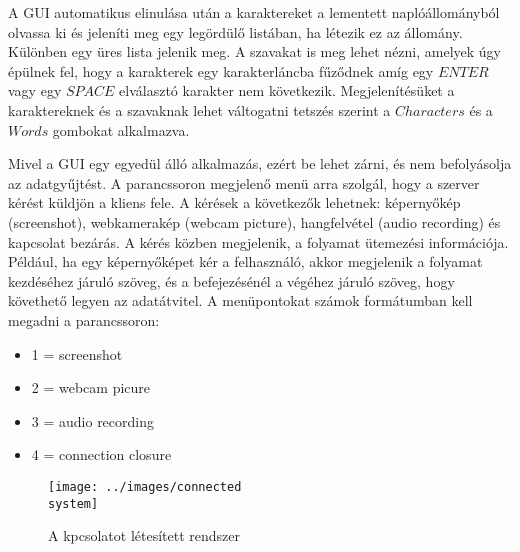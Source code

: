 \documentclass[a4paper, 11pt]{article}
\begin{document}
A GUI automatikus elinulása után a karaktereket a lementett naplóállományból olvassa ki és jeleníti meg egy legördülő listában, ha létezik ez az állomány. Különben egy üres lista jelenik meg. A szavakat is meg lehet nézni, amelyek úgy épülnek fel, hogy a karakterek egy karakterláncba fűződnek amíg egy $ENTER$ vagy egy $SPACE$ elválasztó karakter nem következik. Megjelenítésüket a karaktereknek és a szavaknak lehet váltogatni tetszés szerint a $Characters$ és a $Words$ gombokat alkalmazva.

Mivel a GUI egy egyedül álló alkalmazás, ezért be lehet zárni, és nem befolyásolja az adatgyűjtést. A parancssoron megjelenő menü arra szolgál, hogy a szerver kérést küldjön a kliens fele. A kérések a következők lehetnek: képernyőkép (screenshot), webkamerakép (webcam picture), hangfelvétel (audio recording) és kapcsolat bezárás. A kérés közben megjelenik, a folyamat ütemezési információja. Például, ha egy képernyőképet kér a felhasználó, akkor megjelenik a folyamat kezdéséhez járuló szöveg, és a befejezésénél a végéhez járuló szöveg, hogy követhető legyen az adatátvitel. A menüpontokat számok formátumban kell megadni a parancssoron:
\begin{itemize}
\item 1 = screenshot
\item 2 = webcam picure
\item 3 = audio recording
\item 4 = connection closure
\end{itemize}

\begin{figure}[H]
\centering
\texttt{[image: ../images/connected\\ system]}
\caption{A kpcsolatot létesített rendszer}
\label{fig:seqdia}
\end{figure}
\end{document}
